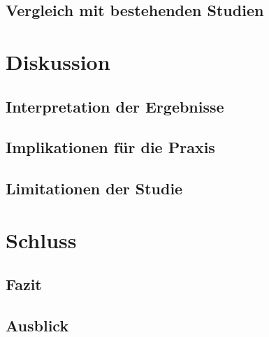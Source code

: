 \documentclass[twoside=false,DIV=8]{scrbook}
\begin{document}
\section{Vergleich mit bestehenden Studien}

\lipsum[4-8]

\chapter{Diskussion}

\section{Interpretation der Ergebnisse}

\lipsum[1-2]

\section{Implikationen für die Praxis}

\lipsum[3-4]

\section{Limitationen der Studie}

\lipsum[5-6]

\chapter{Schluss}

\section{Fazit}

\lipsum[1-2]

\section{Ausblick}

\lipsum[3-4]

\printbibliography
\end{document}
